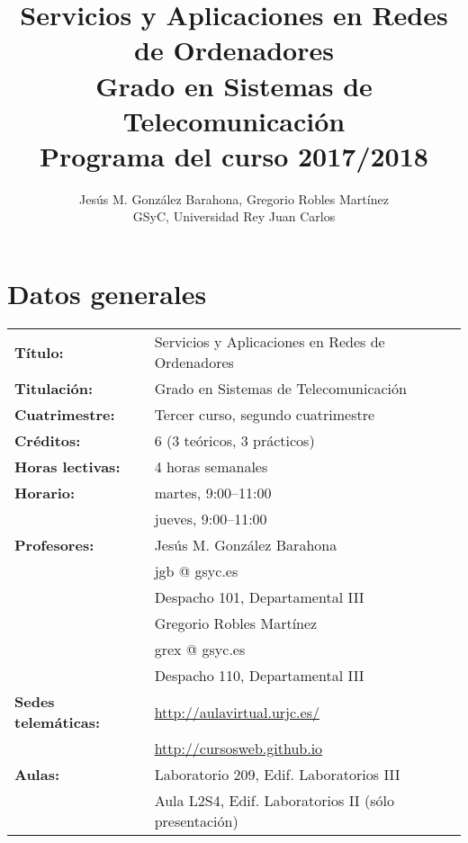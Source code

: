 \documentclass[a4paper,12pt]{article}
\title{Servicios y Aplicaciones en Redes de Ordenadores \\
Grado en Sistemas de Telecomunicación \\
Programa del curso 2017/2018}
\author{Jesús M. González Barahona, Gregorio Robles Martínez \\
GSyC, Universidad Rey Juan Carlos}
\begin{document}
\maketitle

\tableofcontents

\newpage

\section{Datos generales}

\begin{tabular}{ll}
\textbf{Título:} & Servicios y Aplicaciones en Redes de Ordenadores  \\
\textbf{Titulación:} & Grado en Sistemas de Telecomunicación \\
\textbf{Cuatrimestre:} & Tercer curso, segundo cuatrimestre \\
\textbf{Créditos:} & 6 (3 teóricos, 3 prácticos) \\
\textbf{Horas lectivas:} & 4 horas semanales \\
\textbf{Horario:} & martes, 9:00--11:00 \\
                  & jueves, 9:00--11:00 \\
\textbf{Profesores:}
& Jesús M. González Barahona \\
& \hspace{1cm}jgb @ gsyc.es \\
& \hspace{1cm}Despacho 101, Departamental III\\
& Gregorio Robles Martínez\\
& \hspace{1cm}grex @ gsyc.es \\
& \hspace{1cm}Despacho 110, Departamental III\\
\textbf{Sedes telemáticas:} & \url{http://aulavirtual.urjc.es/} \\
                            & \url{http://cursosweb.github.io} \\
\textbf{Aulas:} & Laboratorio 209, Edif. Laboratorios III \\
                & Aula L2S4, Edif. Laboratorios II (sólo presentación)\\
\end{tabular}
\end{document}
